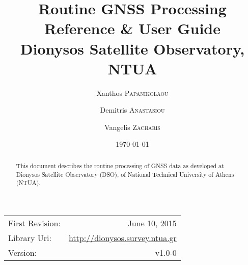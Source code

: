 \documentclass{article}
\title{Routine GNSS Processing \\ Reference \& User Guide \\ Dionysos Satellite Observatory, NTUA} %
\author{Xanthos \textsc{Papanikolaou} \and Demitris \textsc{Anastasiou} \and Vangelis \textsc{Zacharis}} %
\date{\today} %
\begin{document}
\maketitle %

\begin{center}
\begin{tabular}{l r}
First Revision: & June 10, 2015 \\
Library Uri:    & \url{http://dionysos.survey.ntua.gr} \\
Version:        & v1.0-0
\end{tabular}
\end{center}

\begin{abstract}
{\small 
This document describes the routine processing of GNSS data as developed at Dionysos Satellite Observatory (DSO), of National Technical University
of Athens (NTUA).
}
\end{abstract}
\clearpage

\tableofcontents
\clearpage
\end{document}
